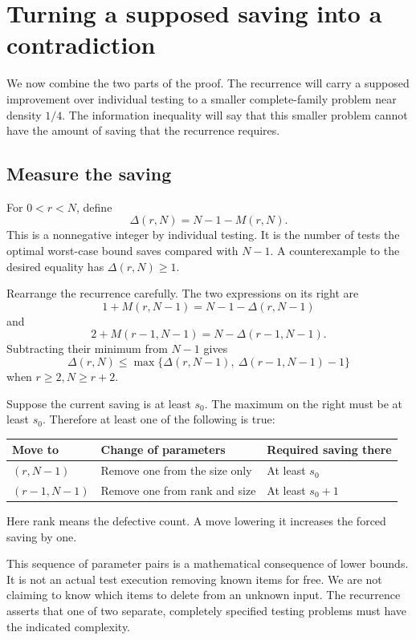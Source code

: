 \documentclass[11pt]{article}
\theoremstyle{definition}
\theoremstyle{remark}
\numberwithin{equation}{section}
\begin{document}
\section{Turning a supposed saving into a contradiction}\label{sec:finalproof}

We now combine the two parts of the proof.
The recurrence will carry a supposed improvement over individual
testing to a smaller complete-family problem near density \(1/4\).
The information inequality will say that this smaller problem cannot
have the amount of saving that the recurrence requires.

\subsection{Measure the saving}

For \(0<r<N\), define
\[
 \Delta(r,N)=N-1-M(r,N).
\]
This is a nonnegative integer by individual testing.
It is the number of tests the optimal worst-case bound saves compared
with \(N-1\).
A counterexample to the desired equality has \(\Delta(r,N)\ge1\).

Rearrange the recurrence carefully. The two expressions on its
right are
\[
 1+M(r,N-1)=N-1-\Delta(r,N-1)
\]
and
\[
 2+M(r-1,N-1)=N-\Delta(r-1,N-1).
\]
Subtracting their minimum from \(N-1\) gives
\begin{equation}\label{eq:savingrecurrence}
 \Delta(r,N)\le
 \max\{\Delta(r,N-1),\ \Delta(r-1,N-1)-1\}
\end{equation}
when \(r\ge2,N\ge r+2\).

Suppose the current saving is at least \(s_0\).
The maximum on the right must be at least \(s_0\).
Therefore at least one of the following is true:
\begin{center}
\begin{tabular}{lll}
\toprule
Move to&Change of parameters&Required saving there\\
\midrule
\((r,N-1)\)&Remove one from the size only&At least \(s_0\)\\
\((r-1,N-1)\)&Remove one from rank and size&At least \(s_0+1\)\\
\bottomrule
\end{tabular}
\end{center}
Here rank means the defective count. A move lowering it increases
the forced saving by one.

This sequence of parameter pairs is a mathematical consequence of
lower bounds. It is not an actual test execution removing known
items for free. We are not claiming to know which items to delete
from an unknown input. The recurrence asserts that one of two
separate, completely specified testing problems must have the
indicated complexity.
\end{document}
